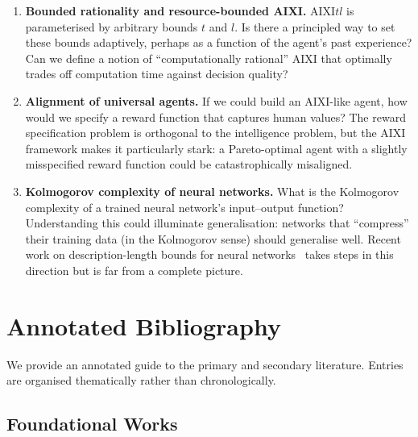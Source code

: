 \documentclass[11pt,a4paper]{article}
\theoremstyle{definition}
\theoremstyle{remark}
\begin{document}
\begin{enumerate}[label=\textbf{OP\arabic*.},leftmargin=*]
\item \textbf{Bounded rationality and resource-bounded AIXI.}
  AIXI$tl$ is parameterised by arbitrary bounds $t$ and $l$.  Is there
  a principled way to set these bounds adaptively, perhaps as a function
  of the agent's past experience?  Can we define a notion of
  ``computationally rational'' AIXI that optimally trades off
  computation time against decision quality?

\item \textbf{Alignment of universal agents.}
  If we could build an AIXI-like agent, how would we specify a reward
  function that captures human values?  The reward specification
  problem is orthogonal to the intelligence problem, but the AIXI
  framework makes it particularly stark: a Pareto-optimal agent with a
  slightly misspecified reward function could be catastrophically
  misaligned.

\item \textbf{Kolmogorov complexity of neural networks.}
  What is the Kolmogorov complexity of a trained neural network's
  input--output function?  Understanding this could illuminate
  generalisation: networks that ``compress'' their training data
  (in the Kolmogorov sense) should generalise well.  Recent work on
  description-length bounds for neural networks~\cite{Lotfi2022}
  takes steps in this direction but is far from a complete picture.

\end{enumerate}

\section{Annotated Bibliography}\label{sec:bib}

We provide an annotated guide to the primary and secondary literature.
Entries are organised thematically rather than chronologically.

\subsection*{Foundational Works}
\end{document}
